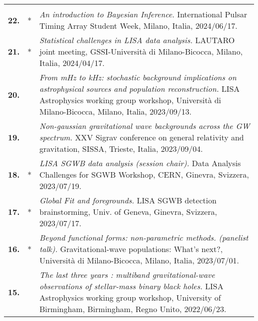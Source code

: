 {\begin{longtable}{rp{0.3cm}p{15.8cm}}
\vspace{0.05cm}\\
%
\textbf{22.} & * & \textit{An introduction to Bayesian Inference.}
\newline{}
International Pulsar Timing Array Student Week, Milano, Italia, 2024/06/17.
\vspace{0.05cm}\\
%
\textbf{21.} & * & \textit{Statistical challenges in LISA data analysis.}
\newline{}
LAUTARO joint meeting, GSSI-Università di Milano-Bicocca, Milano, Italia, 2024/04/17.
\vspace{0.05cm}\\
%
\textbf{20.} &  & \textit{From mHz to kHz: stochastic background implications on astrophysical sources and population reconstruction.}
\newline{}
LISA Astrophysics working group workshop, Università di Milano-Bicocca, Milano, Italia, 2023/09/13.
\vspace{0.05cm}\\
%
\textbf{19.} &  & \textit{Non-gaussian gravitational wave backgrounds across the GW spectrum.}
\newline{}
XXV Sigrav conference on general relativity and gravitation, SISSA, Trieste, Italia, 2023/09/04.
\vspace{0.05cm}\\
%
\textbf{18.} & * & \textit{LISA SGWB data analysis (session chair).}
\newline{}
Data Analysis Challenges for SGWB Workshop, CERN, Ginevra, Svizzera, 2023/07/19.
\vspace{0.05cm}\\
%
\textbf{17.} & * & \textit{Global Fit and foregrounds.}
\newline{}
LISA SGWB detection brainstorming, Univ. of Geneva, Ginevra, Svizzera, 2023/07/17.
\vspace{0.05cm}\\
%
\textbf{16.} & * & \textit{Beyond functional forms: non-parametric methods. (panelist talk).}
\newline{}
Gravitational-wave populations: What's next?, Università di Milano-Bicocca, Milano, Italia, 2023/07/01.
\vspace{0.05cm}\\
%
\textbf{15.} &  & \textit{The last three years : multiband gravitational-wave observations of stellar-mass binary black holes.}
\newline{}
LISA Astrophysics working group workshop, University of Birmingham, Birmingham, Regno Unito, 2022/06/23.

\end{longtable}}

